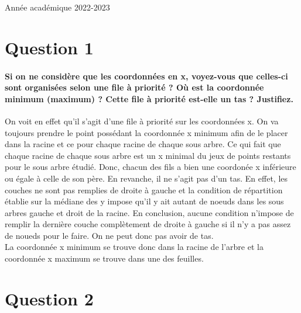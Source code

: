 \documentclass{article}
\begin{document}
\begin{titlepage}
\begin{center}
        {\large Année académique 2022-2023}
        
    \end{center}
\end{titlepage}

\tableofcontents

\newpage

\section{Question 1}
    \paragraph{Si on ne considère que les coordonnées en x, voyez-vous que celles-ci sont organisées selon
    une file à priorité ? Où est la coordonnée minimum (maximum) ? Cette file à priorité est-elle
    un tas ? Justifiez.}
    On voit en effet qu'il s'agit d'une file à priorité sur les coordonnées x. On va toujours prendre le point possédant la coordonnée x minimum
    afin de le placer dans la racine et ce pour chaque racine de chaque sous arbre. Ce qui fait que chaque racine de chaque sous arbre est un x minimal du
    jeux de points restants pour le sous arbre étudié. Donc, chacun des fils a bien une coordonée x inférieure ou égale à celle de son père.
    En revanche, il ne s'agit pas d'un tas. En effet, les couches ne sont pas remplies de droite à gauche et la condition de répartition établie
    sur la médiane des y impose qu'il y ait autant de noeuds dans les sous arbres gauche et droit de la racine. En conclusion, aucune condition
    n'impose de remplir la dernière couche complètement de droite à gauche si il n'y a pas assez de noueds pour le faire. On ne peut donc pas avoir de tas.\\
    La coordonnée x minimum se trouve donc dans la racine de l'arbre et la 
    coordonnée x maximum se trouve dans une des feuilles.

\section{Question 2}
\end{document}
